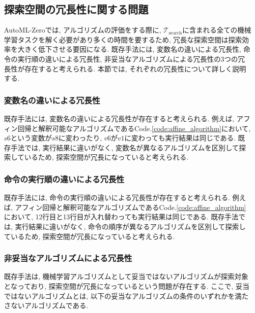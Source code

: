 \documentclass[11pt,oneside,openany,report]{jsbook}
\begin{document}
\subsection{探索空間の冗長性に関する問題}\label{subsec:problem:existing_problem:space}

AutoML-Zeroでは, アルゴリズムの評価をする際に, $\mathcal{T}_\mathrm{search}$に含まれる全ての機械学習タスクを解く必要があり多くの時間を要するため, 冗長な探索空間は探索効率を大きく低下させる要因になる. 既存手法には, 変数名の違いによる冗長性, 命令の実行順の違いによる冗長性, 非妥当なアルゴリズムによる冗長性の3つの冗長性が存在すると考えられる. 本節では, それぞれの冗長性について詳しく説明する.

\subsubsection{変数名の違いによる冗長性}
既存手法には, 変数名の違いによる冗長性が存在すると考えられる. 例えば, アフィン回帰と解釈可能なアルゴリズムであるCode.\ref{code:affine_algorithm}において, $s6$という変数が$s8$に変わったり, $v6$が$v1$に変わっても実行結果は同じである. 既存手法では, 実行結果に違いがなく, 変数名が異なるアルゴリズムを区別して探索しているため, 探索空間が冗長になっていると考えられる.

\subsubsection{命令の実行順の違いによる冗長性}
既存手法には, 命令の実行順の違いによる冗長性が存在すると考えられる. 例えば, アフィン回帰と解釈可能なアルゴリズムであるCode.\ref{code:affine_algorithm}において, 12行目と13行目が入れ替わっても実行結果は同じである. 既存手法では, 実行結果に違いがなく, 命令の順序が異なるアルゴリズムを区別して探索しているため, 探索空間が冗長になっていると考えられる.

\subsubsection{非妥当なアルゴリズムによる冗長性}

既存手法は, 機械学習アルゴリズムとして妥当ではないアルゴリズムが探索対象となっており, 探索空間が冗長になっているという問題が存在する. ここで, 妥当ではないアルゴリズムとは, 以下の妥当なアルゴリズムの条件のいずれかを満たさないアルゴリズムである.
\end{document}
